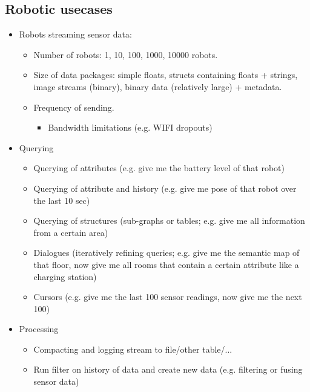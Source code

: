 \documentclass[12pt]{article}
\begin{document}
\subsection{Robotic usecases}
\begin{itemize}
  \item Robots streaming sensor data:
  \begin{itemize}
    \item Number of robots: 1, 10, 100, 1000, 10000 robots.
    \item Size of data packages: simple floats, structs containing floats + strings, image streams (binary), binary data (relatively large) + metadata.
    \item Frequency of sending.
    \begin{itemize}
    		\item Bandwidth limitations (e.g. WIFI dropouts)
    \end{itemize}
  \end{itemize}
\end{itemize}
\begin{itemize}
  \item Querying
  \begin{itemize}
    \item Querying of attributes (e.g. give me the battery level of that robot)
    \item Querying of attribute and history (e.g. give me pose of that robot over the last 10 sec)
    \item Querying of structures (sub-graphs or tables; e.g. give me all information from a certain area)
    \item Dialogues (iteratively refining queries; e.g. give me the semantic map of that floor, now give me all rooms that contain a certain attribute like a charging station)
    \item Cursors (e.g. give me the last 100 sensor readings, now give me the next 100)
  \end{itemize}
\end{itemize}
\begin{itemize}
\item Processing
\begin{itemize}
\item Compacting and logging stream to file/other table/...
\item Run filter on history of data and create new data (e.g. filtering or fusing sensor data)
\end{itemize}
\end{itemize}
\newpage
\end{document}
